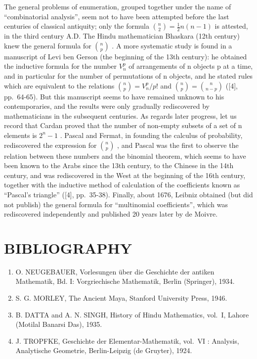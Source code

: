 The general problems of enumeration, grouped together under the name of ``combinatorial analysis'', seem not to have been attempted before the last centuries of classical antiquity; only the formula \(\binom{n}{2} = \frac{1}{2} n(n - 1)\) is attested, in the third century A.D. The Hindu mathematician Bhaskara (12th century) knew the general formula for \(\binom{n}{p}\) . A more systematic study is found in a manuscript of Levi ben Gerson (the beginning of the 13th century): he obtained the inductive formula for the number \(V_{n}^{p}\) of arrangements of n objects p at a time, and in particular for the number of permutations of n objects, and he stated rules which are equivalent to the relations \(\binom{n}{p} = V_{n}^{p}/p!\) and \(\binom{n}{p} = \binom{n}{n-p}\) ({[}4{]}, pp.~64-65). But this manuscript seems to have remained unknown to his contemporaries, and the results were only gradually rediscovered by mathematicians in the subsequent centuries. As regards later progress, let us record that Cardan proved that the number of non-empty subsets of a set of n elements is \(2^{n} - 1\) . Pascal and Fermat, in founding the calculus of probability, rediscovered the expression for \(\binom{n}{p}\) , and Pascal was the first to observe the relation between these numbers and the binomial theorem, which seems to have been known to the Arabs since the 13th century, to the Chinese in the 14th century, and was rediscovered in the West at the beginning of the 16th century, together with the inductive method of calculation of the coefficients known as ``Pascal's triangle'' ({[}4{]}, pp.~35-38). Finally, about 1676, Leibniz obtained (but did not publish) the general formula for ``multinomial coefficients'', which was rediscovered independently and published 20 years later by de Moivre.

\section*{BIBLIOGRAPHY}
{}

\begin{enumerate}
\def\labelenumi{\arabic{enumi}.}
\item
  O. NEUGEBAUER, Vorlesungen über die Geschichte der antiken Mathematik, Bd. I: Vorgriechische Mathematik, Berlin (Springer), 1934.
\item
  S. G. MORLEY, The Ancient Maya, Stanford University Press, 1946.
\item
  B. DATTA and A. N. SINGH, History of Hindu Mathematics, vol.~I, Lahore (Motilal Banarsi Das), 1935.
\item
  J. TROPFKE, Geschichte der Elementar-Mathematik, vol.~VI : Analysis, Analytische Geometrie, Berlin-Leipzig (de Gruyter), 1924.
\end{enumerate}
